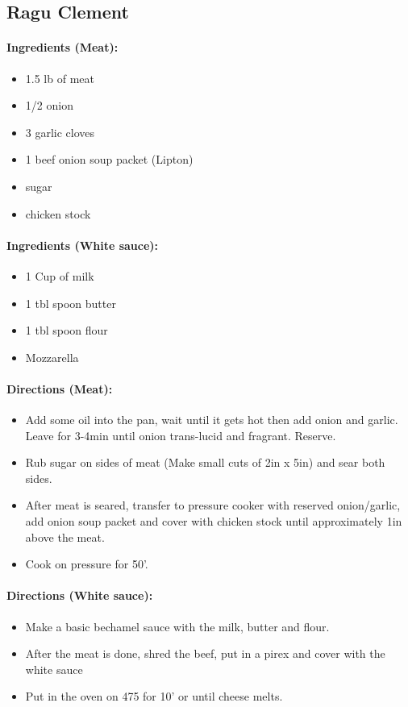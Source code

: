 \documentclass{article}
\begin{document}
\subsection{Ragu Clement} 

\paragraph{Ingredients (Meat):}
\begin{itemize}
    \item 1.5 lb of meat
    \item 1/2 onion
    \item 3 garlic cloves
    \item 1 beef onion soup packet (Lipton)
    \item sugar
    \item chicken stock
\end{itemize}  

\paragraph{Ingredients (White sauce):}
\begin{itemize}
    \item 1 Cup of milk
    \item 1 tbl spoon butter
    \item 1 tbl spoon flour
    \item Mozzarella
\end{itemize}  

\paragraph{Directions (Meat):}
\begin{itemize}
    \item Add some oil into the pan, wait until it gets hot then add onion and garlic. Leave for 3-4min until onion trans-lucid and fragrant. Reserve.
    \item Rub sugar on sides of meat (Make small cuts of 2in x 5in) and sear both sides.
    \item After meat is seared, transfer to pressure cooker with reserved onion/garlic, add onion soup packet and cover with chicken stock until approximately 1in above the meat.
    \item Cook on pressure for 50'.
\end{itemize}  

\paragraph{Directions (White sauce):}
\begin{itemize}
    \item Make a basic bechamel sauce with the milk, butter and flour.
    \item After the meat is done, shred the beef, put in a pirex and cover with the white sauce
    \item Put in the oven on 475 for 10' or until cheese melts.
\end{itemize} 
\end{document}
